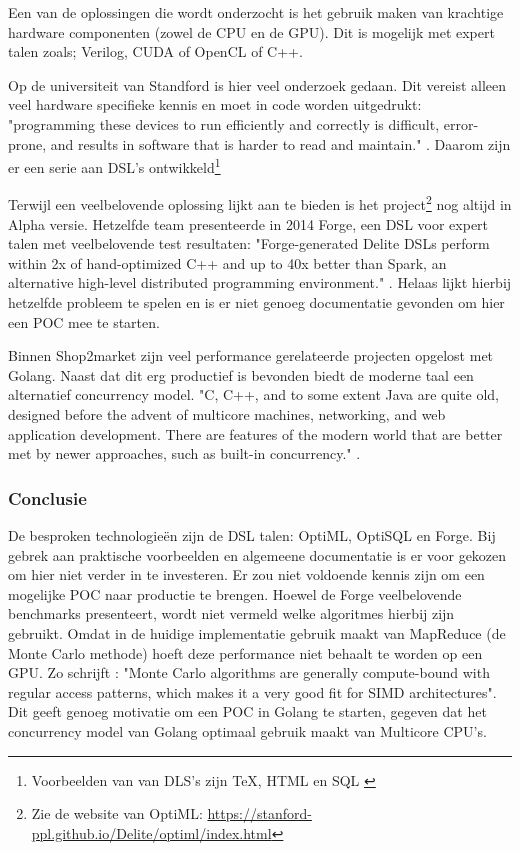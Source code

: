 Een van de oplossingen die wordt onderzocht is het gebruik maken van krachtige hardware componenten (zowel de CPU en de GPU). Dit is mogelijk met expert talen zoals; Verilog, CUDA of OpenCL of C++.


Op de universiteit van Standford is hier veel onderzoek gedaan. Dit vereist alleen veel hardware specifieke kennis en moet in code worden uitgedrukt: "programming these devices to run efficiently and correctly is difficult, error-prone, and results in software that is harder to read and maintain." \parencite{sujeeth2011optiml}. Daarom zijn er een serie aan DSL's ontwikkeld\footnote{Voorbeelden van van DLS's zijn \TeX, HTML en SQL  \parencite{sigplan2000dsl}}

Terwijl \textcite{sujeeth2011optiml} een veelbelovende oplossing lijkt aan te bieden is het project\footnote{Zie de website van OptiML: \url{https://stanford-ppl.github.io/Delite/optiml/index.html}} nog altijd in Alpha versie. Hetzelfde team presenteerde in 2014 Forge, een DSL voor expert talen met veelbelovende test resultaten: "Forge-generated Delite DSLs perform within 2x of hand-optimized C++ and up to 40x better than Spark, an alternative high-level distributed programming environment." \parencite{sujeeth2014forge}. Helaas lijkt hierbij hetzelfde probleem te spelen en is er niet genoeg documentatie gevonden om hier een POC mee te starten.

Binnen Shop2market zijn veel performance gerelateerde projecten opgelost met Golang. Naast dat dit erg productief is bevonden biedt de moderne taal een alternatief concurrency model. "C, C++, and to some extent Java are quite old, designed before the advent of multicore machines, networking, and web application development. There are features of the modern world that are better met by newer approaches, such as built-in concurrency." \parencite{pike2012go}.

\subsubsection{\textbf{Conclusie}}

De besproken technologieën zijn de DSL talen: OptiML, OptiSQL en Forge. Bij gebrek aan praktische voorbeelden en algemeene documentatie is er voor gekozen om hier niet verder in te investeren. Er zou niet voldoende kennis zijn om een mogelijke POC naar productie te brengen. Hoewel de Forge veelbelovende benchmarks presenteert, wordt niet vermeld welke algoritmes hierbij zijn gebruikt. Omdat in de huidige implementatie gebruik maakt van MapReduce (de Monte Carlo methode) hoeft deze performance niet behaalt te worden op een GPU. Zo schrijft \textcite{lee2010debunking}: "Monte Carlo algorithms are generally compute-bound with regular access patterns, which makes it a very good fit for SIMD architectures". Dit geeft genoeg motivatie om een POC in Golang te starten, gegeven dat het concurrency model van Golang optimaal gebruik maakt van Multicore CPU's.


